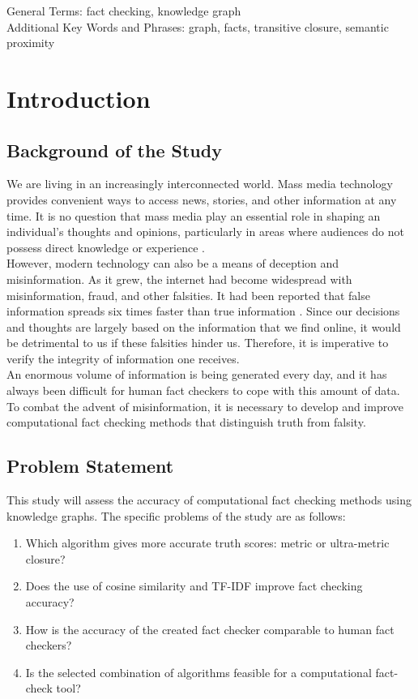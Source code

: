 \documentclass[10pt,11pt,12pt,oneside]{book}
\begin{document}
General Terms: fact checking, knowledge graph\\
Additional Key Words and Phrases: graph, facts, transitive closure, semantic proximity

\tableofcontents{}
\listoffigures{}
\listoftables{}

\mainmatter
\chapter{Introduction}

	\section{Background of the Study}
		We are living in an increasingly interconnected world. Mass media technology provides convenient ways to access news, stories, and other information at any time. It is no question that mass media play an essential role in shaping an individual’s thoughts and opinions, particularly in areas where audiences do not possess direct knowledge or experience \cite{happer_philo_2013}.\\
		
		However, modern technology can also be a means of deception and misinformation. As it grew, the internet had become widespread with misinformation, fraud, and other falsities. It had been reported that false information spreads six times faster than true information \cite{vosoughi2018}. Since our decisions and thoughts are largely based on the information that we find online, it would be detrimental to us if these falsities hinder us. Therefore, it is imperative to verify the integrity of information one receives.\\
		
		An enormous volume of information is being generated every day, and it has always been difficult for human fact checkers to cope with this amount of data. To combat the advent of misinformation, it is necessary to develop and improve computational fact checking methods that distinguish truth from falsity.

	\section{Problem Statement}
		This study will assess the accuracy of computational fact checking methods using knowledge graphs. The specific problems of the study are as follows:
		\begin{enumerate}
			\item Which algorithm gives more accurate truth scores: metric or ultra-metric closure?
			\item Does the use of cosine similarity and TF-IDF improve fact checking accuracy?
			\item How is the accuracy of the created fact checker comparable to human fact checkers?
			\item Is the selected combination of algorithms feasible for a computational fact-check tool?
		\end{enumerate}
	
\end{document}

